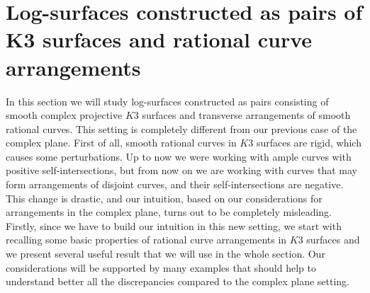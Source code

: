 \documentclass{article}
\theoremstyle{plain}
\theoremstyle{definition}
\numberwithin{equation}{section}
\begin{document}
\section{Log-surfaces constructed as pairs of K3 surfaces and rational curve arrangements}
In this section we will study log-surfaces constructed as pairs consisting of smooth complex projective $K3$ surfaces and transverse arrangements of smooth rational curves. This setting is completely different from our previous case of the complex plane. First of all, smooth rational curves in $K3$ surfaces are rigid, which causes some perturbations. Up to now we were working with ample curves with positive self-intersections, but from now on we are working with curves that may form arrangements of disjoint curves, and their self-intersections are negative. This change is drastic, and our intuition, based on our considerations for arrangements in the complex plane, turns out to be completely misleading. Firstly, since we have to build our intuition  in this new setting, we start with recalling some basic properties of rational curve arrangements in $K3$ surfaces and we present several useful result that we will use in the whole section. Our considerations will be supported by many examples that should help to understand better all the discrepancies compared to the complex plane setting. 
\end{document}
